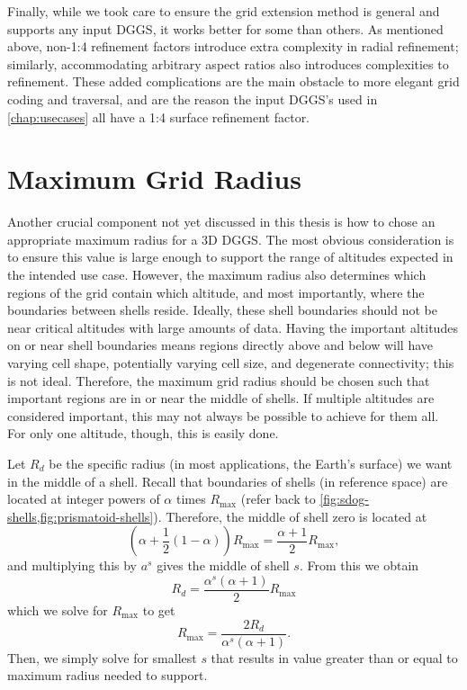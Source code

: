 Finally, while we took care to ensure the grid extension method is general and supports any input DGGS, it works better for some than others.
As mentioned above, non-1:4 refinement factors introduce extra complexity in radial refinement; similarly, accommodating arbitrary aspect ratios also introduces complexities to refinement.
These added complications are the main obstacle to more elegant grid coding and traversal, and are the reason the input DGGS's used in \cref{chap:usecases} all have a 1:4 surface refinement factor.


\section{Maximum Grid Radius}
Another crucial component not yet discussed in this thesis is how to chose an appropriate maximum radius for a 3D DGGS.
The most obvious consideration is to ensure this value is large enough to support the range of altitudes expected in the intended use case.
However, the maximum radius also determines which regions of the grid contain which altitude, and most importantly, where the boundaries between shells reside.
Ideally, these shell boundaries should not be near critical altitudes with large amounts of data.
Having the important altitudes on or near shell boundaries means regions directly above and below will have varying cell shape, potentially varying cell size, and degenerate connectivity; this is not ideal.
Therefore, the maximum grid radius should be chosen such that important regions are in or near the middle of shells.
If multiple altitudes are considered important, this may not always be possible to achieve for them all.
For only one altitude, though, this is easily done.

Let $R_d$ be the specific radius (in most applications, the Earth's surface) we want in the middle of a shell.
Recall that boundaries of shells (in reference space) are located at integer powers of $\alpha$ times $R_\mathrm{max}$ (refer back to \cref{fig:sdog-shells,fig:prismatoid-shells}).
Therefore, the middle of shell zero is located at
%
\begin{equation*}
\left( \alpha + \frac{1}{2} (1 -\alpha) \right) R_\mathrm{max} = \frac{ \alpha + 1 }{2} R_\mathrm{max},
\end{equation*}
%
and multiplying this by $a^s$ gives the middle of shell $s$.
From this we obtain
%
\begin{equation*}
R_d = \frac{ \alpha^s \left( \alpha + 1 \right) }{2} R_\mathrm{max}
\end{equation*}
%
which we solve for $R_\mathrm{max}$ to get
%
\begin{equation*}
R_\mathrm{max} = \frac{2 R_d}{ \alpha^s \left( \alpha + 1 \right) }.
\end{equation*}
%
Then, we simply solve for smallest $s$ that results in value greater than or equal to maximum radius needed to support.
